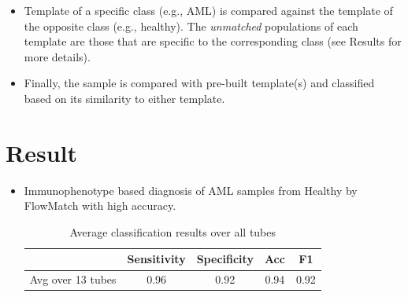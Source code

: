 \documentclass[landscape]{sciposter}
\begin{document}
\begin{multicols}{5}
\begin{minipage} [b]{0.5\linewidth}
\end{minipage}
\begin{itemize}
\item Template of a specific class (e.g., AML) is compared against the template of the opposite class (e.g., healthy). The \emph{unmatched} populations of each template are those that are specific to the corresponding class (see Results for more details).
\end{itemize}
\begin{itemize}
\item Finally, the sample is compared with pre-built template(s) and classified based on its similarity to either template.
\end{itemize}

\columnbreak
\section*{Result}
\begin{itemize}
\item Immunophenotype based diagnosis of AML samples from Healthy by FlowMatch with high accuracy.

\begin{table}[htb]
\centering
\caption {Average classification results over all tubes}
\small {
\resizebox{0.8\textwidth}{!} {
\begin{tabular} {c | c c c c}
 &Sensitivity	&Specificity	&Acc	&F1\\
\hline\hline
Avg	over 13 tubes &0.96	&0.92	&0.94	&0.92	\\
\end{tabular}}
}
\end{table}


\end{itemize}
\end{multicols}
\end{document}

